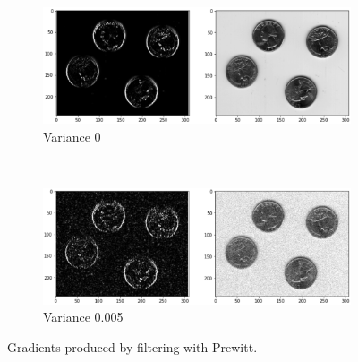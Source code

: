 \begin{figure}[H]
	\centering
	\begin{subfigure}[b]{0.85\textwidth}
		\centering
		\includegraphics[width=\textwidth]{Materials/pvar0}
		\caption{Variance 0}
	\end{subfigure}
	\hfill
	\\
	\begin{subfigure}[b]{0.85\textwidth}
		\centering
		\includegraphics[width=\textwidth]{Materials/pvar005}
		\caption{Variance 0.005}
	\end{subfigure}
	\caption{Gradients produced by filtering with Prewitt.}
	\label{prewitt1}
\end{figure}

